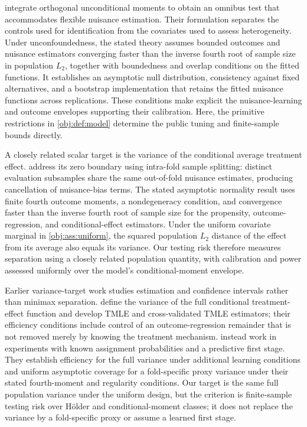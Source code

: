\citet[Assumptions 3.3--3.4, Proposition 3.1, and Section 3.3]{LapentaStrittmatterVergara2026Omnibus} integrate orthogonal unconditional moments to obtain an omnibus test that accommodates flexible nuisance estimation. Their formulation separates the controls used for identification from the covariates used to assess heterogeneity. Under unconfoundedness, the stated theory assumes bounded outcomes and nuisance estimators converging faster than the inverse fourth root of sample size in population \(L_2\), together with boundedness and overlap conditions on the fitted functions. It establishes an asymptotic null distribution, consistency against fixed alternatives, and a bootstrap implementation that retains the fitted nuisance functions across replications. These conditions make explicit the nuisance-learning and outcome envelopes supporting their calibration. Here, the primitive restrictions in \cref{obj:def:model} determine the public tuning and finite-sample bounds directly.

A closely related scalar target is the variance of the conditional average treatment effect. \citet[Assumptions 3--4, Algorithm 1, and Theorem 1]{Yu2026VarianceHTE} address its zero boundary using intra-fold sample splitting: distinct evaluation subsamples share the same out-of-fold nuisance estimates, producing cancellation of nuisance-bias terms. The stated asymptotic normality result uses finite fourth outcome moments, a nondegeneracy condition, and convergence faster than the inverse fourth root of sample size for the propensity, outcome-regression, and conditional-effect estimators. Under the uniform covariate marginal in \cref{obj:ass:uniform}, the squared population \(L_2\) distance of the effect from its average also equals its variance. Our testing risk therefore measures separation using a closely related population quantity, with calibration and power assessed uniformly over the model's conditional-moment envelope.

Earlier variance-target work studies estimation and confidence intervals rather than minimax separation. \citet[Sections 2.1--2.3]{Levy2021} define the variance of the full conditional treatment-effect function and develop TMLE and cross-validated TMLE estimators; their efficiency conditions include control of an outcome-regression remainder that is not removed merely by knowing the treatment mechanism. \citet[Sections 3--4, Theorems 6--7]{SanchezBecerra2023} instead work in experiments with known assignment probabilities and a predictive first stage. They establish efficiency for the full variance under additional learning conditions and uniform asymptotic coverage for a fold-specific proxy variance under their stated fourth-moment and regularity conditions. Our target is the same full population variance under the uniform design, but the criterion is finite-sample testing risk over Hölder and conditional-moment classes; it does not replace the variance by a fold-specific proxy or assume a learned first stage.

